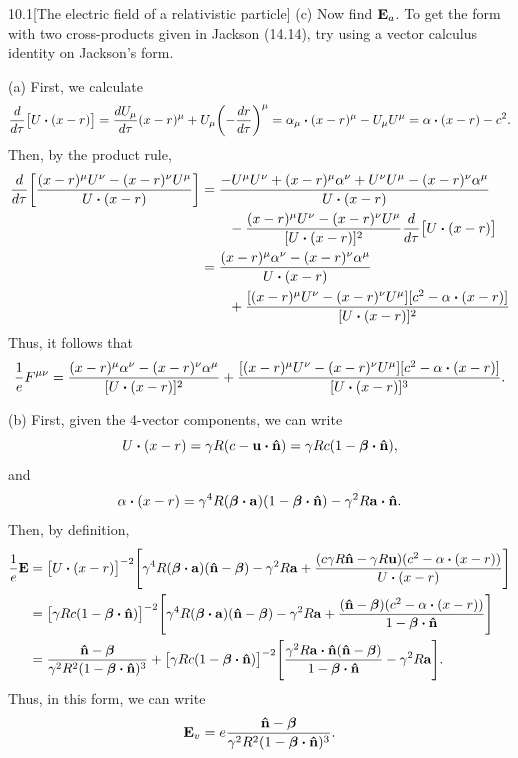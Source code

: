 \documentclass[12pt]{article}
\begin{document}
\begin{problem}{10.1}[The electric field of a relativistic particle]
(c) Now find $\vb{E}_a$. To get the form with two cross-products given in
Jackson (14.14), try using a vector calculus identity on Jackson's form.
\begin{solution}
(a) First, we calculate
\begin{align}
    \frac{d}{d\tau}\qty[U\vdot(x-r)]
    =\frac{dU_\mu}{d\tau}(x-r)^\mu+U_\mu\qty(-\frac{dr}{d\tau})^\mu
    =\alpha_\mu\vdot(x-r)^\mu-U_\mu U^\mu
    =\alpha\vdot(x-r)-c^2.
\end{align}
Then, by the product rule,
\begin{align}
    \frac{d}{d\tau}
    \qty[\frac{(x-r)^\mu U^\nu-(x-r)^\nu U^\mu}{U\vdot(x-r)}]
    &=\frac{-U^\mu U^\nu+(x-r)^\mu\alpha^\nu+U^\nu
    U^\mu-(x-r)^\nu\alpha^\mu}{U\vdot(x-r)}\notag\\
    &\qquad-\frac{(x-r)^\mu U^\nu-(x-r)^\nu
    U^\mu}{[U\vdot(x-r)]^2}\frac{d}{d\tau}\qty[U\vdot(x-r)]\notag\\
    &=\frac{(x-r)^\mu\alpha^\nu-(x-r)^\nu\alpha^\mu}{U\vdot(x-r)}\notag\\
    &\qquad+\frac{[(x-r)^\mu U^\nu - (x-r)^\nu
    U^\mu][c^2-\alpha\vdot(x-r)]}{[U\vdot(x-r)]^2}
\end{align}
Thus, it follows that
\begin{equation}
    \frac1eF^{\mu\nu}
    =\frac{(x-r)^\mu\alpha^\nu-(x-r)^\nu\alpha^\mu}{[U\vdot(x-r)]^2}
    +\frac{[(x-r)^\mu U^\nu-(x-r)^\nu
    U^\mu][c^2-\alpha\vdot(x-r)]}{[U\vdot(x-r)]^3}.
\end{equation}

(b) First, given the 4-vector components, we can write
\begin{equation}
    U\vdot(x-r)=\gamma R(c-\vb{u}\vdot\nhat)
    =\gamma Rc(1-\bm\beta\vdot\nhat),
\end{equation}
and
\begin{equation}
   \alpha\vdot(x-r)
    =\gamma^4R(\bm\beta\vdot\vb{a})\qty(1-\bm\beta\vdot\nhat)-\gamma^2R\vb{a}\vdot\nhat.
\end{equation}
Then, by definition,
\begin{align}\label{p1b}
    \frac1e\vb{E}
    &=\qty[U\vdot(x-r)]^{-2}
    \qty[\gamma^4R(\bm\beta\vdot\vb{a})(\nhat-\bm\beta)-\gamma^2R\vb{a}
    +\frac{(c\gamma R\nhat-\gamma R\vb{u})(c^2-\alpha\vdot(x-r))}{U\vdot(x-r)}]
    \notag\\
    &=\qty[\gamma Rc(1-\bm\beta\vdot\nhat)]^{-2}
    \qty[\gamma^4R(\bm\beta\vdot\vb{a})(\nhat-\bm\beta)
    -\gamma^2R\vb{a}+\frac{(\nhat-\bm\beta)(c^2-\alpha\vdot(x-r))}{1-\bm\beta\vdot\nhat}]\notag\\
    &=\frac{\nhat-\bm\beta}{\gamma^2R^2(1-\bm\beta\vdot\nhat)^3}
    +\qty[\gamma Rc(1-\bm\beta\vdot\nhat)]^{-2}
    \qty[\frac{\gamma^2R\vb{a}\vdot\nhat(\nhat-\bm\beta)}{1-\bm\beta\vdot\nhat}
    -\gamma^2R\vb{a}]
    .
\end{align}
Thus, in this form, we can write
\begin{equation}
    \vb{E}_v=e\frac{\nhat-\bm\beta}{\gamma^2R^2(1-\bm\beta\vdot\nhat)^3}. 
\end{equation}


\end{solution}
\end{problem}
\end{document}
